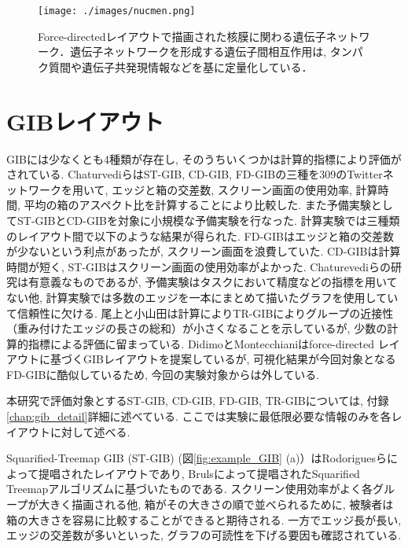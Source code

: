 \documentclass{kuee}
\begin{document}
\begin{figure}
  \centering
  \texttt{[image: ./images/nucmen.png]}
  \caption{Force-directedレイアウトで描画された核膜に関わる遺伝子ネットワーク．遺伝子ネットワークを形成する遺伝子間相互作用は, タンパク質間や遺伝子共発現情報などを基に定量化している． \label{fig:gene}}
\end{figure}

\section{GIBレイアウト}
\label{sec:GIB}
GIBには少なくとも4種類が存在し, そのうちいくつかは計算的指標により評価がされている.
ChaturvediらはST-GIB, CD-GIB, FD-GIBの三種を309のTwitterネットワークを用いて, エッジと箱の交差数, スクリーン画面の使用効率, 計算時間, 平均の箱のアスペクト比を計算することにより比較した\cite{chaturvedi2014group}.
また予備実験としてST-GIBとCD-GIBを対象に小規模な予備実験を行なった.
計算実験では三種類のレイアウト間で以下のような結果が得られた.
FD-GIBはエッジと箱の交差数が少ないという利点があったが, スクリーン画面を浪費していた.
CD-GIBは計算時間が短く, ST-GIBはスクリーン画面の使用効率がよかった.
Chaturevediらの研究は有意義なものであるが, 予備実験はタスクにおいて精度などの指標を用いてない他, 計算実験では多数のエッジを一本にまとめて描いたグラフを使用していて信頼性に欠ける.
尾上と小山田は計算によりTR-GIBによりグループの近接性（重み付けたエッジの長さの総和）が小さくなることを示しているが, 少数の計算的指標による評価に留まっている\cite{onoue2017optimal}.
DidimoとMontecchianiはforce-directed レイアウトに基づくGIBレイアウトを提案している\cite{6295786}が, 可視化結果が今回対象となるFD-GIBに酷似しているため, 今回の実験対象からは外している.

本研究で評価対象とするST-GIB, CD-GIB, FD-GIB, TR-GIBについては, 付録\ref{chap:gib_detail}詳細に述べている.
ここでは実験に最低限必要な情報のみを各レイアウトに対して述べる.

Squarified-Treemap GIB (ST-GIB) (図\ref{fig:example_GIB} (a)）はRodoriguesら\cite{rodrigues2011group}によって提唱されたレイアウトであり, Brulsによって提唱されたSquarified Treemapアルゴリズム\cite{bruls2000squarified}に基づいたものである.
スクリーン使用効率がよく各グループが大きく描画される他, 箱がその大きさの順で並べられるために, 被験者は箱の大きさを容易に比較することができると期待される.
一方でエッジ長が長い, エッジの交差数が多いといった, グラフの可読性を下げる要因も確認されている.
\end{document}
